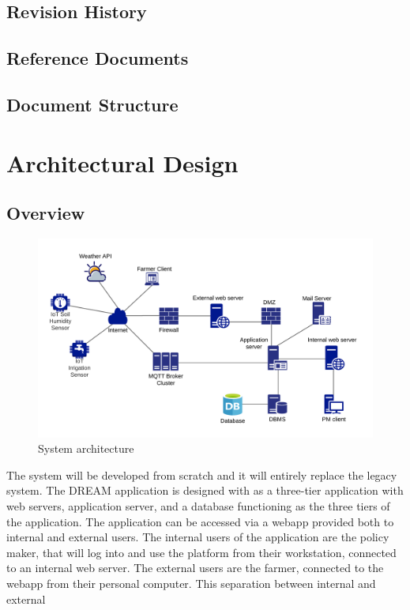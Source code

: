 \documentclass[10pt]{article} %
\begin{document}
\subsection{Revision History}
\subsection{Reference Documents}
\subsection{Document Structure}
\section{Architectural Design}
\subsection{Overview}
\begin{figure}[h]
    \centering
    \includegraphics[scale=0.7]{images/overview_architecture.png}
    \caption{System architecture}
    \label{fig:overview}
\end{figure}
The system will be developed from scratch and it will entirely replace the legacy system.
The DREAM application is designed with as a three-tier application with web servers, application server, and a database functioning as the three tiers of the application.
The application can be accessed via a webapp provided both to internal and external users. The internal users of the application are the policy maker, that will log into and use the platform
from their workstation, connected to an internal web server. The external users are the farmer, connected to the webapp from their personal computer. This separation between internal and external 
\end{document}
